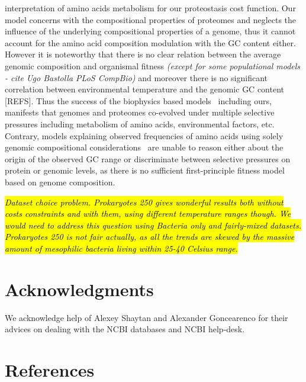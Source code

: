 \documentclass[10pt,letterpaper]{article}
\begin{document}
interpretation of amino acids metabolism for our proteostasis cost function. Our model concerns with the compositional properties of proteomes and neglects the influence of the underlying compositional properties of a genome, thus it cannot account for the amino acid composition modulation with the GC content either. However it is noteworthy that there is no clear relation between the average genomic composition and organismal fitness {\it(except for some populational models - cite Ugo Bastolla PLoS CompBio)} and moreover there is no significant correlation between environmental temperature and the genomic GC content [REFS]. Thus the success of the biophysics based models~\cite{Akashi2002Metabolic,Seligmann2003CostMinimization,Heizer2006Amino,Berezovsky2007Positive} including ours, manifests that genomes and proteomes co-evolved under multiple selective pressures including metabolism of amino acids, environmental factors, etc. Contrary, models explaining observed frequencies of amino acids using solely genomic compositional considerations~\cite{Goncearenco2014Fundamental} are unable to reason either about the origin of the observed GC range or discriminate between selective pressures on protein or genomic levels, as there is no sufficient first-principle fitness model based on genome composition. 


\hl{\it Dataset choice problem. Prokaryotes 250 gives wonderful results both without costs constraints and with them, using different temperature ranges though. We would need to address this question using Bacteria only and fairly-mixed datasets. Prokaryotes 250 is not fair actually, as all the trends are skewed by the massive amount of mesophilic bacteria living within 25-40 Celsius range.}





\section*{Acknowledgments}

We acknowledge help of Alexey Shaytan and Alexander Goncearenco for their advices on dealing with the NCBI databases and NCBI help-desk.

\section*{References}

%
%
% 
\end{document}
